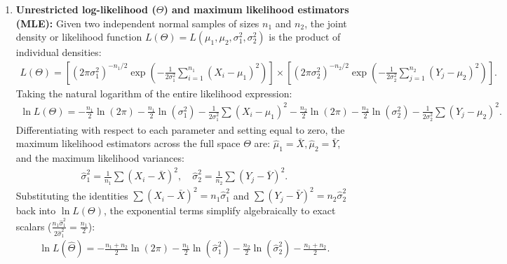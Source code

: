 \begin{solucion}
	\begin{enumerate}
		\item \textbf{Unrestricted log-likelihood ($\Theta$) and maximum likelihood estimators (MLE):}
		Given two independent normal samples of sizes $n_1$ and $n_2$, the joint density or likelihood function $L(\Theta) = L(\mu_1, \mu_2, \sigma_1^2, \sigma_2^2)$ is the product of individual densities:
		\begin{align}
			L(\Theta) = \left[ (2\pi\sigma_1^2)^{-n_1/2} \exp\left(-\frac{1}{2\sigma_1^2}\sum_{i=1}^{n_1}(X_i - \mu_1)^2\right) \right] \times \left[ (2\pi\sigma_2^2)^{-n_2/2} \exp\left(-\frac{1}{2\sigma_2^2}\sum_{j=1}^{n_2}(Y_j - \mu_2)^2\right) \right].
		\end{align}
		Taking the natural logarithm of the entire likelihood expression:
		\begin{align}
			\ln L(\Theta) = -\frac{n_1}{2}\ln(2\pi) - \frac{n_1}{2}\ln(\sigma_1^2) - \frac{1}{2\sigma_1^2}\sum (X_i - \mu_1)^2 -\frac{n_2}{2}\ln(2\pi) - \frac{n_2}{2}\ln(\sigma_2^2) - \frac{1}{2\sigma_2^2}\sum (Y_j - \mu_2)^2.
		\end{align}
		Differentiating with respect to each parameter and setting equal to zero, the maximum likelihood estimators across the full space $\Theta$ are: $\hat{\mu}_1 = \bar{X}, \hat{\mu}_2 = \bar{Y}$, and the maximum likelihood variances:
		\begin{align}
			\hat{\sigma}_1^2 = \frac{1}{n_1}\sum (X_i - \bar{X})^2, \quad \hat{\sigma}_2^2 = \frac{1}{n_2}\sum (Y_j - \bar{Y})^2.
		\end{align}
		Substituting the identities $\sum(X_i - \bar{X})^2 = n_1\hat{\sigma}_1^2$ and $\sum(Y_j - \bar{Y})^2 = n_2\hat{\sigma}_2^2$ back into $\ln L(\Theta)$, the exponential terms simplify algebraically to exact scalars ($\frac{n_1\hat{\sigma}_1^2}{2\hat{\sigma}_1^2} = \frac{n_1}{2}$):
		\begin{align}
			\ln L(\hat{\Theta}) = -\frac{n_1 + n_2}{2}\ln(2\pi) - \frac{n_1}{2}\ln(\hat{\sigma}_1^2) - \frac{n_2}{2}\ln(\hat{\sigma}_2^2) - \frac{n_1 + n_2}{2}.
		\end{align}
		

\end{enumerate}
\end{solucion}
